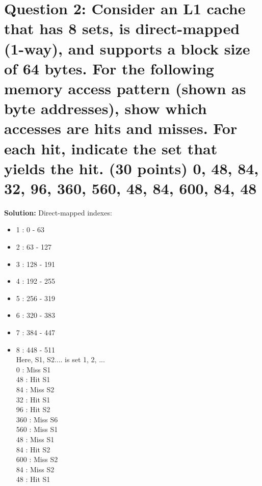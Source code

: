 \documentclass[11pt]{article}
\begin{document}
\section* {Question 2: Consider an L1 cache that has 8 sets, is direct-mapped (1-way), and supports a block size of 64 bytes. For the following memory access pattern (shown as byte addresses), show which accesses are hits and misses. For each hit, indicate the set that yields the hit. (30 points)
0, 48, 84, 32, 96, 360, 560, 48, 84, 600, 84, 48
}
\textbf{Solution: } Direct-mapped indexes: \\
\begin{itemize}
    \item 1 : 0 - 63 \\
    \item 2 : 63 - 127 \\
    \item 3 : 128 - 191 \\
    \item 4 : 192 - 255 \\
    \item 5 : 256 - 319 \\
    \item 6 : 320 - 383 \\
    \item 7 : 384 - 447 \\
    \item 8 : 448 - 511 \\
    \newline 
    Here, S1, S2.... is set 1, 2, ... \\
    0 : Miss S1 \\
    48 : Hit S1 \\
    84 : Miss S2 \\ 
    32 : Hit S1 \\
    96 : Hit S2 \\
    360 : Miss S6 \\
    560 : Miss S1 \\
    48 : Miss S1 \\
    84 : Hit S2 \\
    600 : Miss S2 \\
    84 : Miss S2 \\
    48 : Hit S1 \\
    
\end{itemize}
\end{document}
